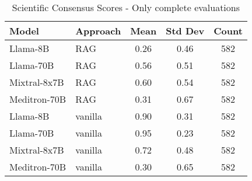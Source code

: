 \begin{table}[h]
\centering
\begin{tabular}{llccc}
\toprule
Model & Approach & Mean & Std Dev & Count \\
\midrule
Llama-8B & RAG & 0.26 & 0.46 & 582 \\
Llama-70B & RAG & 0.56 & 0.51 & 582 \\
Mixtral-8x7B & RAG & 0.60 & 0.54 & 582 \\
Meditron-70B & RAG & 0.31 & 0.67 & 582 \\
Llama-8B & vanilla & 0.90 & 0.31 & 582 \\
Llama-70B & vanilla & 0.95 & 0.23 & 582 \\
Mixtral-8x7B & vanilla & 0.72 & 0.48 & 582 \\
Meditron-70B & vanilla & 0.30 & 0.65 & 582 \\
\bottomrule
\end{tabular}
\caption{Scientific Consensus Scores - Only complete evaluations}
\label{tab:scientific_consensus_complete}
\end{table}